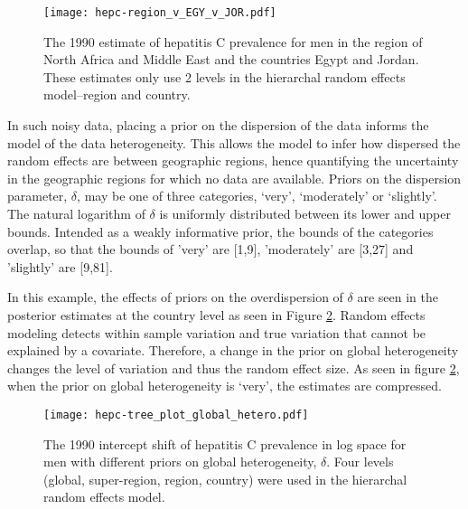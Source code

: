     \begin{figure}[h]
        \begin{center}
            \texttt{[image: hepc-region\_v\_EGY\_v\_JOR.pdf]}
            \caption{The 1990 estimate of hepatitis C prevalence for men in the region of North Africa and Middle East and the countries Egypt and Jordan.  These estimates only use 2 levels in the hierarchal random effects model--region and country.}
            \label{fig:app-hepc regional rfx}
        \end{center}
    \end{figure}

In such noisy data, placing a prior on the dispersion of the data informs the model of the data heterogeneity.  This allows the model to infer how dispersed the random effects are between geographic regions, hence quantifying the uncertainty in the geographic regions for which no data are available.  Priors on the dispersion parameter, $\delta$, may be one of three categories, `very', `moderately' or `slightly'.  The natural logarithm of $\delta$ is uniformly distributed between its lower and upper bounds.  Intended as a weakly informative prior, the bounds of the categories overlap, so that the bounds of 'very' are [1,9], 'moderately' are [3,27] and 'slightly' are [9,81].

In this example, the effects of priors on the overdispersion of $\delta$ are seen in the posterior estimates at the country level as seen in Figure \ref{fig:app-hepc global hetero}.  Random effects modeling detects within sample variation and true variation that cannot be explained by a covariate.  Therefore, a change in the prior on global heterogeneity changes the level of variation and thus the random effect size.  As seen in figure \ref{fig:app-hepc global hetero}, when the prior on global heterogeneity is `very', the estimates are compressed.

    \begin{figure}[h]
        \begin{center}
            \texttt{[image: hepc-tree\_plot\_global\_hetero.pdf]}
            \caption{The 1990 intercept shift of hepatitis C prevalence in log space for men with different priors on global heterogeneity, $\delta$.  Four levels (global, super-region, region, country) were used in the hierarchal random effects model.}
            \label{fig:app-hepc global hetero}
        \end{center}
    \end{figure}

